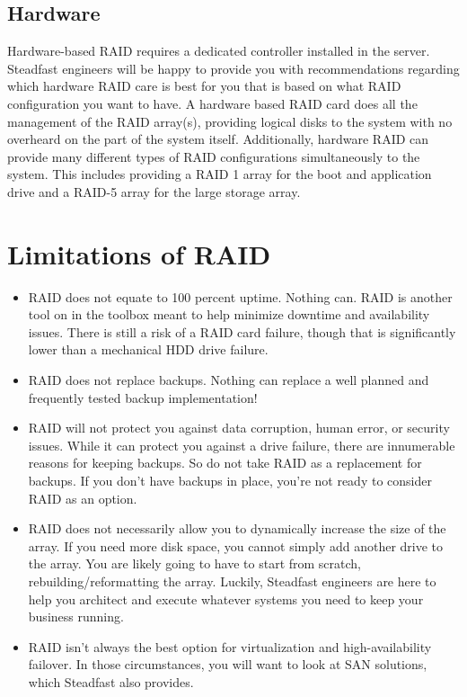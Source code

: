 \documentclass{article}
\begin{document}
\subsection{Hardware}
Hardware-based RAID requires a dedicated controller installed in the server. Steadfast engineers will be happy to provide you with recommendations regarding which hardware RAID care is best for you that is based on what RAID configuration you want to have. A hardware based RAID card does all the management of the RAID array(s), providing logical disks to the system with no overheard on the part of the system itself. Additionally, hardware RAID can provide many different types of RAID configurations simultaneously to the system. This includes providing a RAID 1 array for the boot and application drive and a RAID-5 array for the large storage array.

\section{Limitations of  RAID}

\begin{itemize}
\item RAID does not equate to 100 percent uptime. Nothing can. RAID is another tool on in the toolbox meant to help minimize downtime and availability issues. There is still a risk of a RAID card failure, though that is significantly lower than a mechanical HDD drive failure.

\item RAID does not replace backups. Nothing can replace a well planned and frequently tested backup implementation!

\item RAID will not protect you against data corruption, human error, or security issues. While it can protect you against a drive failure, there are innumerable reasons for keeping backups. So do not take RAID as a replacement for backups. If you don’t have backups in place, you’re not ready to consider RAID as an option.

\item RAID does not necessarily allow you to dynamically increase the size of the array. If you need more disk space, you cannot simply add another drive to the array. You are likely going to have to start from scratch, rebuilding/reformatting the array. Luckily, Steadfast engineers are here to help you architect and execute whatever systems you need to keep your business running. 
 
\item RAID isn’t always the best option for virtualization and high-availability failover. In those circumstances, you will want to look at SAN solutions, which Steadfast also provides.
\end{itemize}
\end{document}

